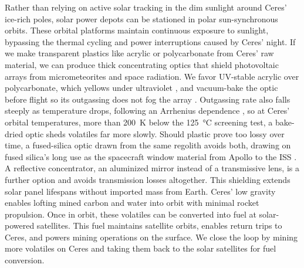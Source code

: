 \documentclass{article}
\begin{document}
Rather than relying on active solar tracking in the dim sunlight around Ceres' ice-rich poles, solar power depots can be stationed in polar sun-synchronous orbits. These orbital platforms maintain continuous exposure to sunlight, bypassing the thermal cycling and power interruptions caused by Ceres' night. If we make transparent plastics like acrylic or polycarbonate from Ceres' raw material, we can produce thick concentrating optics that shield photovoltaic arrays from micrometeorites and space radiation. We favor UV-stable acrylic over polycarbonate, which yellows under ultraviolet \cite{polycarbonate_uv_aging}, and vacuum-bake the optic before flight so its outgassing does not fog the array \cite{outgassing_rp1124}. Outgassing rate also falls steeply as temperature drops, following an Arrhenius dependence \cite{outgassing_temperature_decay}, so at Ceres' orbital temperatures, more than \SI{200}{\kelvin} below the \SI{125}{\celsius} screening test, a bake-dried optic sheds volatiles far more slowly. Should plastic prove too lossy over time, a fused-silica optic drawn from the same regolith avoids both, drawing on fused silica's long use as the spacecraft window material from Apollo to the ISS \cite{fused_silica_windows}.  A reflective concentrator, an aluminized mirror instead of a transmissive lens, is a further option and avoids transmission losses altogether. This shielding extends solar panel lifespans without imported mass from Earth. Ceres' low gravity enables lofting mined carbon and water into orbit with minimal rocket propulsion. Once in orbit, these volatiles can be converted into fuel at solar-powered satellites.  This fuel maintains satellite orbits, enables return trips to Ceres, and powers mining operations on the surface.   We close the loop by mining more volatiles on Ceres and taking them back to the solar satellites for fuel conversion.
\end{document}
